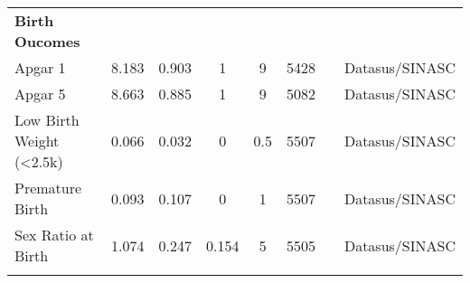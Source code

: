 \begin{table}[H]
\begin{footnotesize}
\begin{center}
{\begin{threeparttable}[b]
\begin{tabular}{rrrrrrrr}
    \multicolumn{1}{l}{\textbf{Birth Oucomes}} &       &       &       &       &       &       &  \\
    \multicolumn{1}{l}{Apgar 1} & \multicolumn{1}{c}{8.183} & \multicolumn{1}{c}{0.903} & \multicolumn{1}{c}{1} & \multicolumn{1}{c}{9} & \multicolumn{1}{c}{5428} &       & \multicolumn{1}{c}{Datasus/SINASC} \\
    \multicolumn{1}{l}{Apgar 5} & \multicolumn{1}{c}{8.663} & \multicolumn{1}{c}{0.885} & \multicolumn{1}{c}{1} & \multicolumn{1}{c}{9} & \multicolumn{1}{c}{5082} &       & \multicolumn{1}{c}{Datasus/SINASC} \\
    \multicolumn{1}{l}{Low Birth Weight (<2.5k)} & \multicolumn{1}{c}{0.066} & \multicolumn{1}{c}{0.032} & \multicolumn{1}{c}{0} & \multicolumn{1}{c}{0.5} & \multicolumn{1}{c}{5507} &       & \multicolumn{1}{c}{Datasus/SINASC} \\
    \multicolumn{1}{l}{Premature Birth} & \multicolumn{1}{c}{0.093} & \multicolumn{1}{c}{0.107} & \multicolumn{1}{c}{0} & \multicolumn{1}{c}{1} & \multicolumn{1}{c}{5507} &       & \multicolumn{1}{c}{Datasus/SINASC} \\
    \multicolumn{1}{l}{Sex Ratio at Birth} & \multicolumn{1}{c}{1.074} & \multicolumn{1}{c}{0.247} & \multicolumn{1}{c}{0.154} & \multicolumn{1}{c}{5} & \multicolumn{1}{c}{5505} &       & \multicolumn{1}{c}{Datasus/SINASC} \\
          &       &       &       &       &       &       &  \\
    \bottomrule
    \bottomrule
    \end{tabular}%
    



\end{threeparttable}
}
\end{center}
\end{footnotesize}
\end{table}
